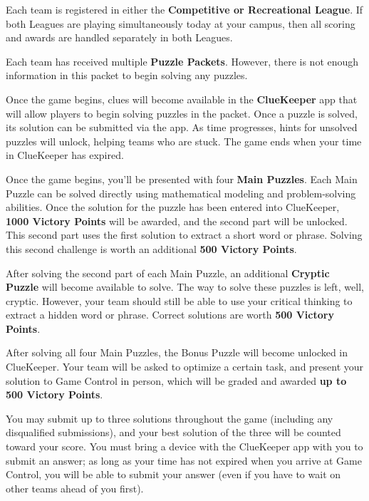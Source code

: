 
Each team is registered in either the \textbf{Competitive or Recreational League}.
If both Leagues are playing simultaneously today at your campus, then all
scoring and awards are handled separately in both Leagues.


Each team has received multiple \textbf{Puzzle Packets}. However, there is
not enough information in this packet to begin solving any puzzles.

Once the game begins, clues will become available in the \textbf{ClueKeeper} app that
will allow players to begin solving puzzles in the packet. Once a puzzle is
solved, its solution can be submitted via the app. As time progresses, hints
for unsolved puzzles will unlock, helping teams who are stuck. The game
ends when your time in ClueKeeper has expired.


Once the game begins, you'll be presented with four \textbf{Main Puzzles}. 
Each Main Puzzle can be solved directly using mathematical modeling
and problem-solving abilities. Once the solution for the puzzle has been
entered into ClueKeeper, \textbf{1000 Victory Points} will be awarded,
and the second part will be unlocked. This second part uses the first
solution to extract a short word or phrase. Solving this second challenge
is worth an additional \textbf{500 Victory Points}.


After solving the second part of each Main Puzzle, an additional
\textbf{Cryptic Puzzle} will become available to solve.
The way to solve these puzzles is left, well,
cryptic. However, your team should still be able to use your
critical thinking to extract a hidden word or phrase. Correct
solutions are worth \textbf{500 Victory Points}.


After solving all four Main Puzzles, the Bonus Puzzle will become unlocked
in ClueKeeper. Your team will be asked to optimize a certain task, and
present your solution to Game Control in person, which will be graded and
awarded \textbf{up to 500 Victory Points}. 

You may submit up to three solutions throughout
the game (including any disqualified submissions), and your best solution of the
three will be counted toward your score. You must bring a device with the 
ClueKeeper app with you to submit an answer; as long as your time has not
expired when you arrive at Game Control, you will be able to submit your
answer (even if you have to wait on other teams ahead of you first).

